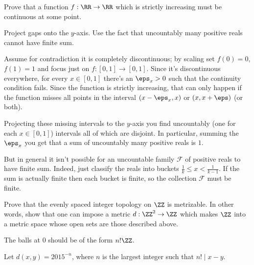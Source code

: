 \begin{problem}
	\gim
	Prove that a function $f : \RR \to \RR$ which is strictly increasing
	must be continuous at some point.
	\begin{hint}
		Project gaps onto the $y$-axis.
		Use the fact that uncountably many positive reals cannot have finite sum.
	\end{hint}
	\begin{sol}
		Assume for contradiction it is completely discontinuous;
		by scaling set $f(0) = 0$, $f(1) = 1$ and focus just on $f : [0,1] \to [0,1]$.
		Since it's discontinuous everywhere, for every $x \in [0,1]$ there's an $\eps_x > 0$ such that the continuity condition fails.
		Since the function is strictly increasing, that can only happen if the function misses all points in the interval $(x-\eps_x, x)$ or $(x, x+\eps)$ (or both).

		Projecting these missing intervals to the $y$-axis you find uncountably (one for each $x \in [0,1]$) intervals
		all of which are disjoint.
		In particular, summing the $\eps_x$ you get that a sum of uncountably many positive reals is $1$.

		But in general it isn't possible for an uncountable family $\mathcal F$ of positive reals to have finite sum.
		Indeed, just classify the reals into buckets $\frac1k \le x < \frac1{k-1}$.
		If the sum is actually finite then each bucket is finite, so the collection $\mathcal F$ must be finite.
	\end{sol}
\end{problem}

\begin{problem}
	\gim
	Prove that the evenly spaced integer topology on $\ZZ$ is metrizable.
	In other words, show that one can impose a metric $d : \ZZ^2 \to \ZZ$
	which makes $\ZZ$ into a metric space whose open sets are those described above.
	\begin{hint}
		The balls at $0$ should be of the form $n!\ZZ$.
	\end{hint}
	\begin{sol}
		Let $d(x,y) = 2015^{-n}$, where $n$ is the largest integer such that $n! \mid x-y$.
	\end{sol}
\end{problem}
